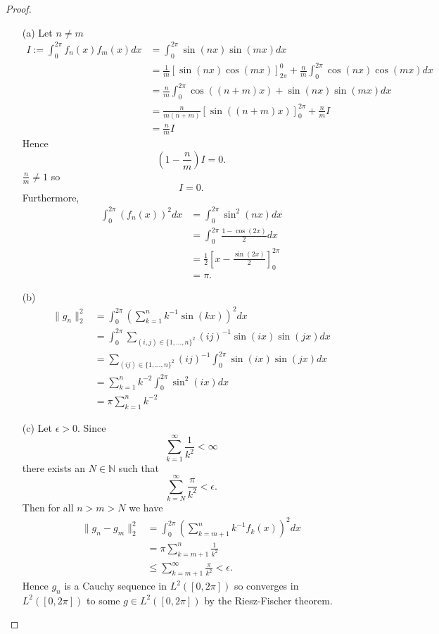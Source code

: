\documentclass{article}
\begin{document}
\begin{proof}
\begin{enumerate}
    \item[(a)] Let $n\neq m$\begin{align*}
    I:=\int_0^{2\pi}f_n(x)f_m(x)dx&=\int_0^{2\pi}\sin(nx)\sin(mx)dx\\&=\frac{1}{m}\left[\sin(nx)\cos(mx)\right]_{2\pi}^0 +\frac{n}{m}\int_0^{2\pi}\cos(nx)\cos(mx)dx\\&=\frac{n}{m}\int_0^{2\pi}\cos((n+m)x)+\sin(nx)\sin(mx)dx\\&=\frac{n}{m(n+m)}\left[\sin((n+m)x)\right]_0^{2\pi}+\frac{n}{m}I\\&=\frac{n}{m}I
    \end{align*}
    Hence \[(1-\frac{n}{m})I=0.\]$\frac{n}{m}\neq 1$ so \[I=0.\]Furthermore,\begin{align*}
    \int_0^{2\pi}(f_n(x))^2dx&=\int_0^{2\pi}\sin^2(nx)dx\\&=\int_0^{2\pi}\frac{1-\cos(2x)}{2}dx\\&=\frac{1}{2}\left[x-\frac{\sin(2x)}{2}\right]_0^{2\pi}\\&=\pi.
    \end{align*}
    \item[(b)] \begin{align*}\|g_n\|_2^2&=\int_0^{2\pi}\left(\sum_{k=1}^nk^{-1}\sin(kx)\right)^2dx\\&=\int_0^{2\pi}\sum_{(i,j)\in\{1,...,n\}^2}(ij)^{-1}\sin(ix)\sin(jx)dx\\&=\sum_{(ij)\in\{1,...,n\}^2}(ij)^{-1}\int_0^{2\pi}\sin(ix)\sin(jx)dx\\&=\sum_{k=1}^nk^{-2}\int_0^{2\pi}\sin^2(ix)dx\\&=\pi\sum_{k=1}^nk^{-2}\end{align*}
    \item[(c)] Let $\epsilon>0$. Since\[\sum_{k=1}^\infty\frac{1}{k^2}<\infty\] there exists an $N\in\mathbb{N}$ such that \[\sum_{k=N}^\infty\frac{\pi}{k^2}<\epsilon.\]
Then for all $n>m>N$ we have
    \begin{align*}
    \|g_n-g_m\|_2^2&=\int_0^{2\pi}\left(\sum_{k=m+1}^n k^{-1}f_k(x)\right)^2dx\\&=\pi\sum_{k=m+1}^n\frac{1}{k^2}\\&\leq\sum_{k=m+1}^\infty\frac{\pi}{k^2}<\epsilon.
    \end{align*}
    Hence $g_n$ is a Cauchy sequence in $L^2([0,2\pi])$ so converges in $L^2([0,2\pi])$ to some $g\in L^2([0,2\pi])$ by the Riesz-Fischer theorem.
\end{enumerate}
\end{proof}
\end{document}
